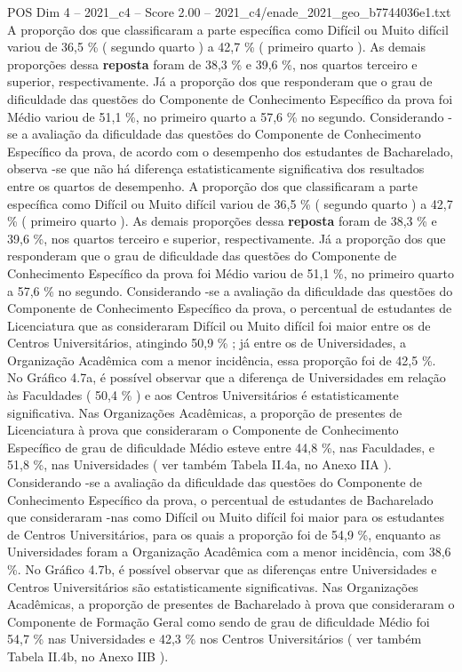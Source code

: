 \begin{textsample}{POS Dim 4 – 2021\_c4 – Score 2.00 – 2021\_c4/enade\_2021\_geo\_b7744036e1.txt}
A proporção dos que classificaram a parte específica como Difícil ou Muito difícil variou de 36,5 \% ( segundo quarto ) a 42,7 \% ( primeiro quarto ).
As demais proporções dessa \textbf{reposta} foram de 38,3 \% e 39,6 \%, nos quartos terceiro e superior, respectivamente.
Já a proporção dos que responderam que o grau de dificuldade das questões do Componente de Conhecimento Específico da prova foi Médio variou de 51,1 \%, no primeiro quarto a 57,6 \% no segundo.
Considerando -se a avaliação da dificuldade das questões do Componente de Conhecimento Específico da prova, de acordo com o desempenho dos estudantes de Bacharelado, observa -se que não há diferença estatisticamente significativa dos resultados entre os quartos de desempenho.
A proporção dos que classificaram a parte específica como Difícil ou Muito difícil variou de 36,5 \% ( segundo quarto ) a 42,7 \% ( primeiro quarto ).
As demais proporções dessa \textbf{reposta} foram de 38,3 \% e 39,6 \%, nos quartos terceiro e superior, respectivamente.
Já a proporção dos que responderam que o grau de dificuldade das questões do Componente de Conhecimento Específico da prova foi Médio variou de 51,1 \%, no primeiro quarto a 57,6 \% no segundo.
Considerando -se a avaliação da dificuldade das questões do Componente de Conhecimento Específico da prova, o percentual de estudantes de Licenciatura que as consideraram Difícil ou Muito difícil foi maior entre os de Centros Universitários, atingindo 50,9 \% ; já entre os de Universidades, a Organização Acadêmica com a menor incidência, essa proporção foi de 42,5 \%.
No Gráfico 4.7a, é possível observar que a diferença de Universidades em relação às Faculdades ( 50,4 \% ) e aos Centros Universitários é estatisticamente significativa.
Nas Organizações Acadêmicas, a proporção de presentes de Licenciatura à prova que consideraram o Componente de Conhecimento Específico de grau de dificuldade Médio esteve entre 44,8 \%, nas Faculdades, e 51,8 \%, nas Universidades ( ver também Tabela II.4a, no Anexo IIA ).
Considerando -se a avaliação da dificuldade das questões do Componente de Conhecimento Específico da prova, o percentual de estudantes de Bacharelado que consideraram -nas como Difícil ou Muito difícil foi maior para os estudantes de Centros Universitários, para os quais a proporção foi de 54,9 \%, enquanto as Universidades foram a Organização Acadêmica com a menor incidência, com 38,6 \%.
No Gráfico 4.7b, é possível observar que as diferenças entre Universidades e Centros Universitários são estatisticamente significativas.
Nas Organizações Acadêmicas, a proporção de presentes de Bacharelado à prova que consideraram o Componente de Formação Geral como sendo de grau de dificuldade Médio foi 54,7 \% nas Universidades e 42,3 \% nos Centros Universitários ( ver também Tabela II.4b, no Anexo IIB ).

\end{textsample}
